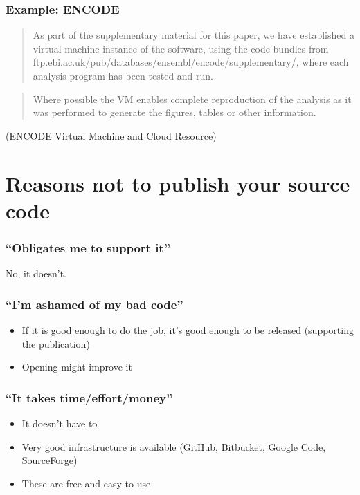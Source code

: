 \documentclass[slidestop]{beamer}
\begin{document}
\begin{frame}
  \frametitle{Example: ENCODE}
  \begin{quote}
    As part of the supplementary material for this paper, we have established
    a virtual machine instance of the software, using the code bundles from
    ftp.ebi.ac.uk/pub/databases/ensembl/encode/supplementary/, where each
    analysis program has been tested and run.
  \end{quote}
  \begin{quote}
    Where possible the VM enables complete reproduction of the analysis as it
    was performed to generate the figures, tables or other information.
  \end{quote}
  (ENCODE Virtual Machine and Cloud Resource)
\end{frame}

\section{Reasons not to publish your source code}


\begin{frame}
  \frametitle{``Obligates me to support it''}
  \pause
  No, it doesn't.
\end{frame}

\begin{frame}
  \frametitle{``I'm ashamed of my bad code''}
  \pause
  \begin{itemize}
    \item If it is good enough to do the job, it's good enough to be released
      (supporting the publication)
    \item Opening might improve it
  \end{itemize}
\end{frame}


\begin{frame}
  \frametitle{``It takes time/effort/money''}
  \pause
  \begin{itemize}
    \item It doesn't have to
    \item Very good infrastructure is available (GitHub, Bitbucket, Google
      Code, SourceForge)
    \item These are free and easy to use
  \end{itemize}
\end{frame}
\end{document}
